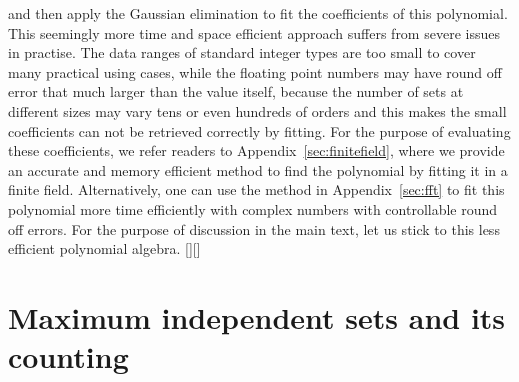 \documentclass[onefignum, onetabnum]{siamart190516}
\newcommand{\<}{\langle}
\renewcommand{\>}{\rangle}
\newcommand{\App}[1]{Appendix~\ref{#1}}
\newcommand{\blue}[1]{[{\bf  \color{blue}{JG: #1}}]}
\newcommand{\purple}[1]{[{\bf  \color{purple}{MC: #1}}]}
\begin{document}
and then apply the Gaussian elimination to fit the coefficients of this polynomial.
This seemingly more time and space efficient approach suffers from severe issues in practise.
The data ranges of standard integer types are too small to cover many practical using cases,
while the floating point numbers may have round off error that much larger than the value itself, because the number of sets at different sizes may vary tens or even hundreds of orders and this makes the small coefficients can not be retrieved correctly by fitting.
For the purpose of evaluating these coefficients, we refer readers to \App{sec:finitefield}, where we provide an accurate and memory efficient method to find the polynomial by fitting it in a finite field.
Alternatively, one can use the method in \App{sec:fft} to fit this polynomial more time efficiently with complex numbers with controllable round off errors.
For the purpose of discussion in the main text, let us stick to this less efficient polynomial algebra.
\purple{It's not clear to me what we gain by using the
polynomial semiring rather than floating points/integers here. Could you comment on
how the compiler can optimize on this data type?}\blue{I added some discussion here to address why we stick to polynomial number types,
for short, it is a dynamic type that can be slow, so we do not use it a lot in practise.
I mention it here because it is the base of the following discussion.}

\section{Maximum independent sets and its counting}\label{sec:counting}
\end{document}
